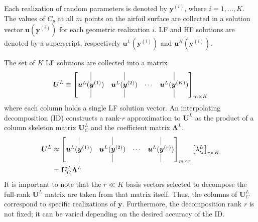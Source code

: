 \documentclass[11pt]{article}
\begin{document}
Each realization of random parameters is denoted by $\bm{y}^{(i)}$, where $i = 1, \dots, K$. The values of $C_p$ at all $m$ points on the airfoil surface are collected in a solution vector $\bm{u}(\bm{y}^{(i)})$ for each geometric realization $i$. LF and HF solutions are denoted by a superscript, respectively $\bm{u}^L(\bm{y}^{(i)})$ and $\bm{u}^H(\bm{y}^{(i)})$.

The set of $K$ LF solutions are collected into a matrix
\begin{equation}
\bm{U}^L
\equiv
\begin{bmatrix}
\vline & \vline & & \vline \\
\bm{u}^L(\bm{y}^{(1)}) & \bm{u}^L(\bm{y}^{(2)}) & \cdots & \bm{u}^L(\bm{y}^{(K)}) \\
\vline & \vline & & \vline
\end{bmatrix}_{m \times K}
\end{equation}
where each column holds a single LF solution vector. An interpolating decomposition \citeme (ID) constructs a rank-$r$ approximation to $\bm{U}^L$ as the product of a column skeleton matrix $\bm{U}^L_C$ and the coefficient matrix $\bm{\Lambda}^L$.
\begin{equation}
\begin{aligned}
\bm{U}^L
&\approx
\begin{bmatrix}
\vline & \vline & & \vline \\
\bm{u}^L(\bm{y}^{(1)}) & \bm{u}^L(\bm{y}^{(2)}) & \cdots & \bm{u}^L(\bm{y}^{(r)}) \\
\vline & \vline & & \vline
\end{bmatrix}_{m \times r}
\begin{bmatrix}
\lambda^L_{ij}
\end{bmatrix}_{r \times K}
\\
&= \bm{U}^L_C \bm{\Lambda}^L
\end{aligned}
\end{equation}
It is important to note that the $r \ll K$ basis vectors selected to decompose the full-rank $\bm{U}^L$ matrix are taken from that matrix itself. Thus, the columns of $\bm{U}^L_C$ correspond to specific realizations of $\bm{y}$. Furthermore, the decomposition rank $r$ is not fixed; it can be varied depending on the desired accuracy of the ID.
\end{document}
